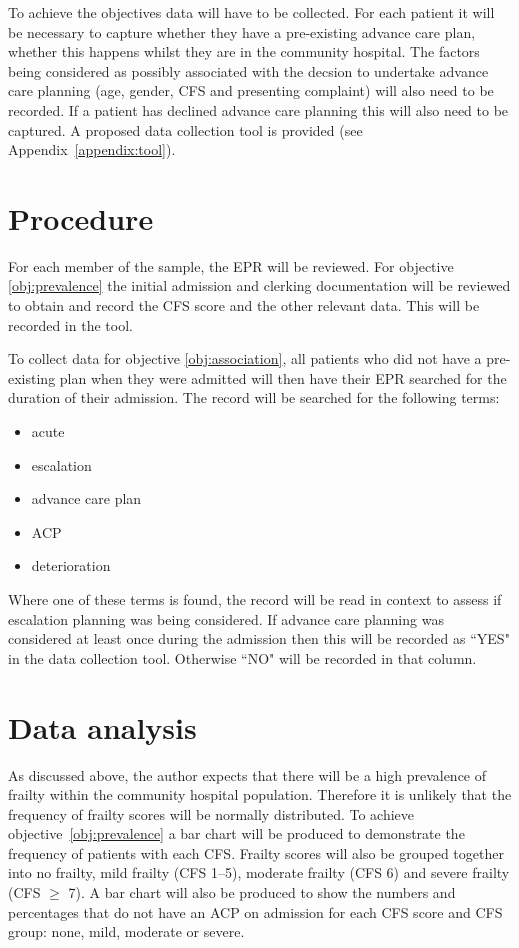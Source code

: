 \documentclass
[
	12pt,
	a4paper,
	oneside,
]{article}
\begin{document}
To achieve the objectives data will have to be collected. For each patient it 
will be necessary to capture whether they have a pre-existing
advance care plan, whether this happens whilst they are in the community
hospital. The factors being considered as possibly associated with the decsion to
undertake advance care planning (age, gender, CFS and presenting complaint) will
also need to be recorded. If a patient has declined advance care planning this will
also need to be captured. A proposed data collection tool is provided
(see Appendix~\ref{appendix:tool}).

\section{Procedure}
\label{sec:procedure}
For each member of the sample, the EPR will be reviewed. 
For objective \ref{obj:prevalence} 
the initial admission and clerking documentation will be reviewed to obtain and
record the CFS score and the other relevant data. This will be recorded in the tool.


To collect data for objective \ref{obj:association}, all patients who did not have
a pre-existing plan when they were admitted will then have their EPR searched
for the duration of their admission. The record will be searched for the following
terms:

\begin{itemize}
\item acute
\item escalation
\item advance care plan
\item ACP
\item deterioration
\end{itemize}

Where one of these terms is found, the record will be read in context to assess if 
escalation planning was being considered. If advance care planning 
was considered at least once during the admission then this will be recorded as ``YES"
in the data collection tool. Otherwise ``NO" will be recorded in that column.

\section{Data analysis}
As discussed above, the author expects that there will be a high prevalence of frailty 
within the community hospital population. Therefore it is unlikely that the frequency
of frailty scores will be normally distributed. To achieve objective~\ref{obj:prevalence}
a bar chart will be produced to demonstrate the frequency of patients with each CFS.
Frailty scores will also be grouped together into no frailty, mild frailty (CFS 1--5),
moderate frailty (CFS 6) and severe frailty (CFS $\geq$ 7). A bar chart will also 
be produced to show the numbers and percentages that do not have an ACP on admission
for each CFS score and CFS group: none, mild, moderate or severe.
\end{document}
